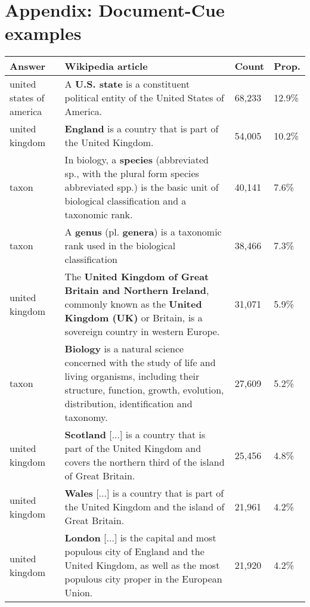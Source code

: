 \documentclass[11pt,letterpaper]{article}
\begin{document}
\section{Appendix: Document-Cue examples}\label{appendix:cue-examples}
\begin{table*}
    \centering
    \begin{tabular}{p{} p{} p{} p{}}
        \textbf{Answer}       & \textbf{Wikipedia article}  & \textbf{Count}  & \textbf{Prop.} \\
        \toprule
        united states of america    & A \textbf{U.S. state} is a constituent political entity of the United States of America. & 68,233 & 12.9\%   \\
        \midrule
        united kingdom    & \textbf{England} is a country that is part of the United Kingdom. & 54,005 & 10.2\%   \\
        \midrule
        taxon    & In biology, a \textbf{species} (abbreviated sp., with the plural form species abbreviated spp.) is the basic unit of biological classification and a taxonomic rank. & 40,141  & 7.6\%    \\
        \midrule
        taxon    &  A \textbf{genus} (pl. \textbf{genera}) is a taxonomic rank used in the biological classification & 38,466 & 7.3\%    \\
        \midrule
        united kingdom    & The \textbf{United Kingdom of Great Britain and Northern Ireland}, commonly known as the \textbf{United Kingdom (UK)} or Britain, is a sovereign country in western Europe.  & 31,071  & 5.9\%  \\
        \midrule
        taxon    & \textbf{Biology} is a natural science concerned with the study of life and living organisms, including their structure, function, growth, evolution, distribution, identification and taxonomy. & 27,609   & 5.2\%  \\
        \midrule
        united kingdom    &  \textbf{Scotland} [...] is a country that is part of the United Kingdom and covers the northern third of the island of Great Britain.  & 25,456  & 4.8\%     \\
        \midrule
        united kingdom    & \textbf{Wales} [...] is a country that is part of the United Kingdom and the island of Great Britain.  & 21,961 & 4.2\%     \\
        \midrule
        united kingdom    & \textbf{London} [...] is the capital and most populous city of England and the United Kingdom, as well as the most populous city proper in the European Union. & 21,920  & 4.2\%  \\

\end{tabular}
\end{table*}
\end{document}
